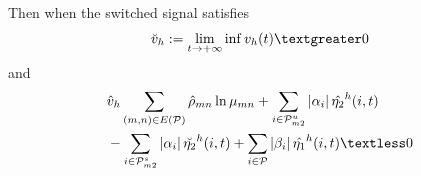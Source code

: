 \documentclass[twocolumn]{autart}    %
\begin{document}
\begin{thm}
    Then when the switched signal satisfies 
\begin{equation}
    \begin{aligned}
        \setlength{\arraycolsep}{0.9pt}
        \breve{v}_{h}:= \lim_{t \rightarrow +\infty}\inf  v_{h}(t) \textgreater 0
    \end{aligned}
\end{equation}
and
\begin{equation}
    \begin{aligned}
        \setlength{\arraycolsep}{0.9pt}
        &\hat{v}_{h}\sum_{(m,n) \in E(\mathcal{P})}\hat{\rho}_{mn}\ln\mu_{mn}+\sum_{i \in \mathcal{P}_{m2}^{u}}\left|\alpha_{i}\right|\hat{\eta_{2}}^{h}(i,t)\\
        & -\sum_{i \in \mathcal{P}_{m2}^{s}}\left|\alpha_{i}\right|\breve{\eta_{2}}^{h}(i,t)+\sum_{i \in \mathcal{P}}\left|\beta_{i}\right|\hat{\eta_{1}}^{h}(i,t) \textless 0
    \end{aligned}
\end{equation}
\end{thm}
\end{document}
